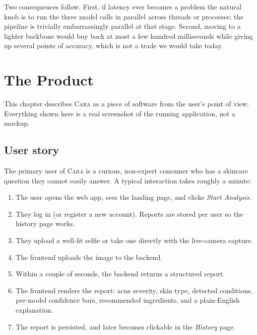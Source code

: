\documentclass[11pt,a4paper,oneside]{report}
\newcommand{\cara}{\textsc{Cara}\xspace}
\begin{document}
Two consequences follow. First, if latency ever becomes a problem
the natural knob is to run the three model calls in parallel
across threads or processes; the pipeline is trivially embarrassingly
parallel at that stage. Second, moving to a lighter backbone would
buy back at most a few hundred milliseconds while giving up
several points of accuracy, which is not a trade we would take
today.

\chapter{The Product}\label{ch:product}

This chapter describes \cara as a piece of software from the user's
point of view. Everything shown here is a real screenshot of the
running application, not a mockup.

\section{User story}

The primary user of \cara is a curious, non-expert consumer who has
a skincare question they cannot easily answer. A typical
interaction takes roughly a minute:

\begin{enumerate}
    \item The user opens the web app, sees the landing page, and
        clicks \emph{Start Analysis}.
    \item They log in (or register a new account). Reports are
        stored per user so the history page works.
    \item They upload a well-lit selfie or take one directly with
        the live-camera capture.
    \item The frontend uploads the image to the backend.
    \item Within a couple of seconds, the backend returns a
        structured report.
    \item The frontend renders the report: acne severity, skin
        type, detected conditions, per-model confidence bars,
        recommended ingredients, and a plain-English explanation.
    \item The report is persisted, and later becomes clickable in
        the \emph{History} page.
\end{enumerate}
\end{document}
